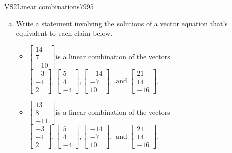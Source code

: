 \begin{exercise}{VS2}{Linear combinations}{7995} 
\begin{exerciseStatement} 

\begin{enumerate}[(a)]
\item  

 Write a statement involving the solutions of a vector equation that's equivalent to each claim below. 

 

\begin{itemize}
\item  

 \(\left[\begin{array}{c}
14 \\
7 \\
-10
\end{array}\right]\)is a linear combination of the vectors \(\left[\begin{array}{c}
-3 \\
-1 \\
2
\end{array}\right] , \left[\begin{array}{c}
5 \\
4 \\
-4
\end{array}\right] , \left[\begin{array}{c}
-14 \\
-7 \\
10
\end{array}\right] , \text{ and } \left[\begin{array}{c}
21 \\
14 \\
-16
\end{array}\right]\). 

 
\item  

 \(\left[\begin{array}{c}
13 \\
8 \\
-11
\end{array}\right]\)is a linear combination of the vectors \(\left[\begin{array}{c}
-3 \\
-1 \\
2
\end{array}\right] , \left[\begin{array}{c}
5 \\
4 \\
-4
\end{array}\right] , \left[\begin{array}{c}
-14 \\
-7 \\
10
\end{array}\right] , \text{ and } \left[\begin{array}{c}
21 \\
14 \\
-16
\end{array}\right]\). 


\end{itemize}
\end{enumerate}
\end{exerciseStatement}
\end{exercise}
